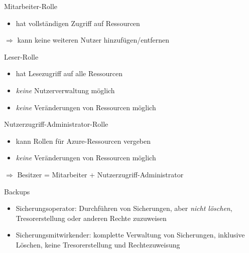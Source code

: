 \begin{flashcard}[Definition]{Mitarbeiter-Rolle}
    \begin{itemize}
        \item hat vollständigen Zugriff auf Ressourcen
    \end{itemize}
    $\Rightarrow$ kann keine weiteren Nutzer hinzufügen/entfernen
\end{flashcard}

\begin{flashcard}[Definition]{Leser-Rolle}
    \begin{itemize}
        \item hat Lesezugriff auf alle Ressourcen
        \item \emph{keine} Nutzerverwaltung möglich
        \item \emph{keine} Veränderungen von Ressourcen möglich
    \end{itemize}
\end{flashcard}

\begin{flashcard}[Definition]{Nutzerzugriff-Administrator-Rolle}
    \begin{itemize}
        \item kann Rollen für Azure-Ressourcen vergeben
        \item \emph{keine} Veränderungen von Ressourcen möglich
    \end{itemize}
    $\Rightarrow$ Besitzer = Mitarbeiter + Nutzerzugriff-Administrator
\end{flashcard}

\begin{flashcard}[Definition]{Backups}
    \begin{itemize}
        \item Sicherungsoperator: Durchführen von Sicherungen, aber \emph{nicht löschen}, Tresorerstellung oder anderen Rechte zuzuweisen
        \item Sicherungsmitwirkender: komplette Verwaltung von Sicherungen, inklusive Löschen, keine Tresorerstellung und Rechtezuweisung
    \end{itemize}
\end{flashcard}

